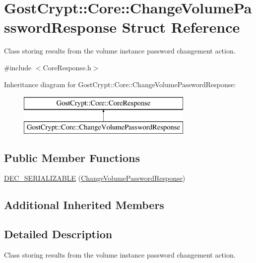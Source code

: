 \hypertarget{struct_gost_crypt_1_1_core_1_1_change_volume_password_response}{}\section{Gost\+Crypt\+:\+:Core\+:\+:Change\+Volume\+Password\+Response Struct Reference}
\label{struct_gost_crypt_1_1_core_1_1_change_volume_password_response}


Class storing results from the volume instance password changement action.  




{\ttfamily \#include $<$Core\+Response.\+h$>$}

Inheritance diagram for Gost\+Crypt\+:\+:Core\+:\+:Change\+Volume\+Password\+Response\+:\begin{figure}[H]
\begin{center}
\leavevmode
\includegraphics[height=2.000000cm]{struct_gost_crypt_1_1_core_1_1_change_volume_password_response}
\end{center}
\end{figure}
\subsection*{Public Member Functions}
\begin{DoxyCompactItemize}
\item 
\hyperlink{struct_gost_crypt_1_1_core_1_1_change_volume_password_response_a6f073f0481b0c86a63e477f581d2f2f3}{D\+E\+C\+\_\+\+S\+E\+R\+I\+A\+L\+I\+Z\+A\+B\+LE} (\hyperlink{struct_gost_crypt_1_1_core_1_1_change_volume_password_response}{Change\+Volume\+Password\+Response})
\end{DoxyCompactItemize}
\subsection*{Additional Inherited Members}


\subsection{Detailed Description}
Class storing results from the volume instance password changement action. 

